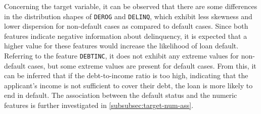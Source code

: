 Concerning the target variable, it can be observed that there are some differences in the distribution shapes of \texttt{DEROG} and \texttt{DELINQ}, which exhibit less skewness and lower dispersion for non-default cases as compared to default cases.
Since both features indicate negative information about delinquency, it is expected that a higher value for these features would increase the likelihood of loan default.
Referring to the feature \texttt{DEBTINC}, it does not exhibit any extreme values for non-default cases, but some extreme values are present for default cases.
From this, it can be inferred that if the debt-to-income ratio is too high, indicating that the applicant's income is not sufficient to cover their debt, the loan is more likely to end in default.
The association between the default status and the numeric features is further investigated in \autoref{subsubsec:target-num-ass}.

